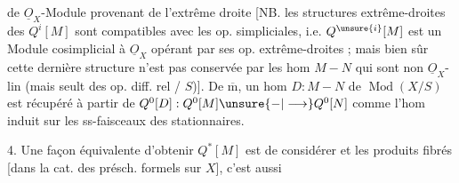 de $\underline O_X$-Module provenant de l'extrême droite
[NB. les structures extrême-droites des $Q^i[M]$ sont compatibles avec les op. simpliciales, i.e. $Q^{\unsure{i}}[M]$ est un Module cosimplicial à $\underline O_X$ opérant par ses op. extrême-droites ; mais bien sûr cette dernière structure n'est pas conservée par les hom $M-N$ qui sont non $\underline O_X$-lin (mais seult des op. diff. rel / $S$)]. De $\overline{\mathrm m}$, un hom $D:M-N$ de $\operatorname{Mod}(X/S)$ est récupéré à partir de $Q^0[D]:Q^0[M]\unsure{-|\longrightarrow}Q^0[N]$ comme l'hom induit sur les ss-faisceaux des  stationnaires.

4. Une façon équivalente d'obtenir $Q^*[M]$ est de considérer
et les produits fibrés [dans la cat. des présch. formels sur $X$],  c'est aussi

